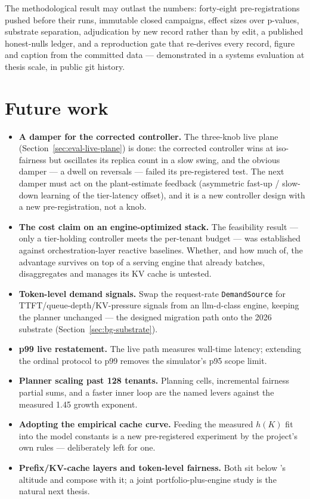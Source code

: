 The methodological result may outlast the numbers: forty-eight
pre-registrations pushed before their runs, immutable closed campaigns,
effect sizes over p-values, substrate separation, adjudication by new
record rather than by edit, a published honest-nulls ledger, and a
reproduction gate that re-derives every record, figure and caption from
the committed data --- demonstrated in a systems evaluation at thesis
scale, in public git history.

\section{Future work}

\begin{itemize}
  \item \textbf{A damper for the corrected controller.} The three-knob
        live plane (Section~\ref{sec:eval-live-plane}) is done: the
        corrected controller wins at iso-fairness but oscillates its
        replica count in a slow swing, and the obvious damper --- a dwell
        on reversals --- failed its pre-registered test. The next damper
        must act on the plant-estimate feedback (asymmetric fast-up /
        slow-down learning of the tier-latency offset), and it is a new
        controller design with a new pre-registration, not a knob.
  \item \textbf{The cost claim on an engine-optimized stack.} The
        feasibility result --- only a tier-holding controller meets the
        per-tenant budget --- was established against orchestration-layer
        reactive baselines. Whether, and how much of, the advantage
        survives on top of a serving engine that already batches,
        disaggregates and manages its KV cache is untested.
  \item \textbf{Token-level demand signals.} Swap the request-rate
        \texttt{DemandSource} for TTFT/queue-depth/KV-pressure signals from
        an llm-d-class engine, keeping the planner unchanged --- the
        designed migration path onto the 2026 substrate
        (Section~\ref{sec:bg-substrate}).
  \item \textbf{p99 live restatement.} The live path measures wall-time
        latency; extending the ordinal protocol to p99 removes the
        simulator's p95 scope limit.
  \item \textbf{Planner scaling past 128 tenants.} Planning cells,
        incremental fairness partial sums, and a faster inner loop are the
        named levers against the measured 1.45 growth exponent.
  \item \textbf{Adopting the empirical cache curve.} Feeding the measured
        $h(K)$ fit into the model constants is a new pre-registered
        experiment by the project's own rules --- deliberately left for one.
  \item \textbf{Prefix/KV-cache layers and token-level fairness.} Both sit
        below \polyforge{}'s altitude and compose with it; a joint
        portfolio-plus-engine study is the natural next thesis.
\end{itemize}


